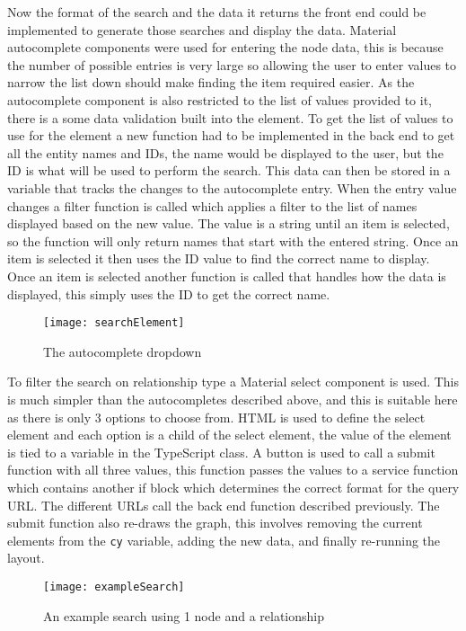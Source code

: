 Now the format of the search and the data it returns the front end could be implemented to generate those searches and display the data.
Material autocomplete components were used for entering the node data, this is because the number of possible entries is very large so allowing the 
user to enter values to narrow the list down should make finding the item required easier. As the autocomplete component is also restricted to the list 
of values provided to it, there is a some data validation built into the element. To get the list of values to use for the element a new function had to be 
implemented in the back end to get all the entity names and IDs, the name would be displayed to the user, but the ID is what will be used to perform the search.
This data can then be stored in a variable that tracks the changes to the autocomplete entry. When the entry value changes a filter function is called which applies 
a filter to the list of names displayed based on the new value. The value is a string until an item is selected, so the function will only return names that start with the entered string. 
Once an item is selected it then uses the ID value to find the correct name to display. Once an item is selected another function is called that handles how the data is displayed,
this simply uses the ID to get the correct name.
\begin{figure}[H]
    \centering
    \texttt{[image: searchElement]}
    \caption{The autocomplete dropdown}
\end{figure}
To filter the search on relationship type a Material select component is used. This is much simpler than the autocompletes described above, and this is 
suitable here as there is only 3 options to choose from. HTML is used to define the select element and each option is a child of the select element, 
the value of the element is tied to a variable in the TypeScript class.
A button is used to call a submit function with all three values, this function passes the values to a service function which contains another if block 
which determines the correct format for the query URL. The different URLs call the back end function described previously.
The submit function also re-draws the graph, this involves removing the current elements from the \verb|cy| variable, adding the new data, and finally re-running 
the layout.
\begin{figure}[H]
    \centering
    \texttt{[image: exampleSearch]}
    \caption{An example search using 1 node and a relationship}
\end{figure}